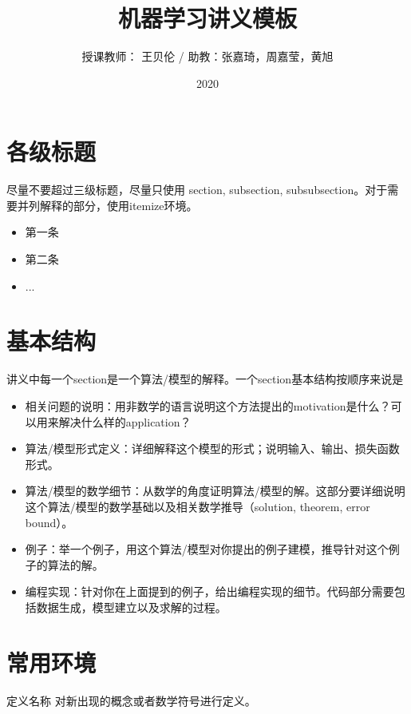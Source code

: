 \documentclass[a4paper,9pt]{extarticle}
\title{机器学习讲义模板}
\author{授课教师： 王贝伦  /  助教：张嘉琦，周嘉莹，黄旭}
\date{2020}
\begin{document}
\maketitle

\begin{multicols*}{2}

\section{各级标题}
    尽量不要超过三级标题，尽量只使用 section, subsection, subsubsection。对于需要并列解释的部分，使用itemize环境。
    
    \begin{itemize}
        \item 第一条
        \item 第二条
        \item ...
    \end{itemize}
    
    
\section{基本结构}
    讲义中每一个section是一个算法/模型的解释。一个section基本结构按顺序来说是
    \begin{itemize}
        \item [(1)] 相关问题的说明：用非数学的语言说明这个方法提出的motivation是什么？可以用来解决什么样的application？
        \item [(2)] 算法/模型形式定义：详细解释这个模型的形式；说明输入、输出、损失函数形式。
        \item [(3)] 算法/模型的数学细节：从数学的角度证明算法/模型的解。这部分要详细说明这个算法/模型的数学基础以及相关数学推导（solution, theorem, error bound）。
        \item [(4)] 例子：举一个例子，用这个算法/模型对你提出的例子建模，推导针对这个例子的算法的解。
        \item [(5)]编程实现：针对你在上面提到的例子，给出编程实现的细节。代码部分需要包括数据生成，模型建立以及求解的过程。
    \end{itemize}

\section{常用环境}

\begin{mydef}{定义名称}
    对新出现的概念或者数学符号进行定义。
\end{mydef}


\end{multicols*}
\end{document}

